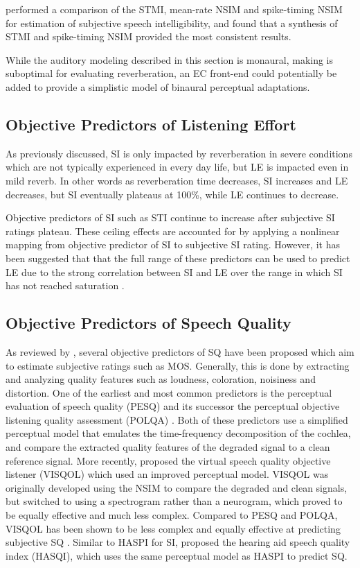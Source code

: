 \cite{wirtzfeld2017predictions} performed a comparison of the STMI, mean-rate NSIM and spike-timing NSIM for estimation of subjective speech intelligibility, and found that a synthesis of STMI and spike-timing NSIM provided the most consistent results. 

While the auditory modeling described in this section is monaural, making is suboptimal for evaluating reverberation, an EC front-end could potentially be added to provide a simplistic model of binaural perceptual adaptations.


\subsection {Objective Predictors of Listening Effort}

As previously discussed, SI is only impacted by reverberation in severe conditions which are not typically experienced in every day life, but LE is impacted even in mild reverb. In other words as reverberation time decreases, SI increases and LE decreases, but SI eventually plateaus at 100\%, while LE continues to decrease. 

Objective predictors of SI such as STI continue to increase after subjective SI ratings plateau. These ceiling effects are accounted for by applying a nonlinear mapping from objective predictor of SI to subjective SI rating. However, it has been suggested that that the full range of these predictors can be used to predict LE due to the strong correlation between SI and LE over the range in which SI has not reached saturation \citep{schepker2016perceived}.

\subsection{Objective Predictors of Speech Quality}

As reviewed by \cite{torcoli2021objective}, several objective predictors of SQ have been proposed which aim to estimate subjective ratings such as MOS. Generally, this is done by extracting and analyzing quality features such as loudness, coloration, noisiness and distortion. One of the earliest and most common predictors is the perceptual evaluation of speech quality (PESQ) \citep{itu2003pesq} and its successor the perceptual objective listening quality assessment (POLQA) \citep{itu2011polqa}. Both of these predictors use a simplified perceptual model that emulates the time-frequency decomposition of the cochlea, and compare the extracted quality features of the degraded signal to a clean reference signal. More recently, \cite{hines2015visqol} proposed the virtual speech quality objective listener (VISQOL) which used an improved perceptual model. VISQOL was originally developed using the NSIM to compare the degraded and clean signals, but switched to using a spectrogram rather than a neurogram, which proved to be equally effective and much less complex. Compared to PESQ and POLQA, VISQOL has been shown to be less complex and equally effective at predicting subjective SQ \citep{hines2013robustness}. Similar to HASPI for SI, \cite{kates2022overview} proposed the hearing aid speech quality index (HASQI), which uses the same perceptual model as HASPI to predict SQ.


